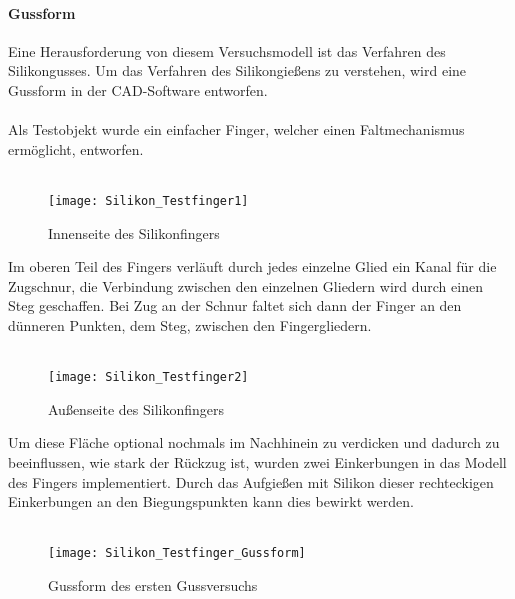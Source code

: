 \documentclass[titlepage,12pt,twoside]{article}
\begin{document}
\paragraph{Gussform}
\label{par:Gussform}
\hfill \break
\hfill \break
Eine Herausforderung von diesem Versuchsmodell ist das Verfahren des Silikongusses.  Um das Verfahren des Silikongießens zu verstehen, wird eine Gussform in der CAD-Software entworfen. \\
\\
Als Testobjekt wurde ein einfacher Finger, welcher einen Faltmechanismus ermöglicht, entworfen. \\
\\
\begin{figure}[H]
	\begin{center}
		\scalebox{0.8}
		{\texttt{[image: Silikon\_Testfinger1]}}
		\caption{Innenseite des Silikonfingers}
		\label{fig:Silikon_Testfinger1}			
	\end{center}
\end{figure}
\hfill \break
Im oberen Teil des Fingers verläuft durch jedes einzelne Glied ein Kanal für die Zugschnur, die Verbindung zwischen den einzelnen Gliedern wird durch einen Steg geschaffen. Bei Zug an der Schnur faltet sich dann der Finger an den dünneren Punkten, dem Steg, zwischen den Fingergliedern. \\
\\
\begin{figure}[H]
	\begin{center}
		\scalebox{0.8}
		{\texttt{[image: Silikon\_Testfinger2]}}
		\caption{Außenseite des Silikonfingers}
		\label{fig:Silikon_Testfinger2}			
	\end{center}
\end{figure}
\hfill \break
Um diese Fläche optional nochmals im Nachhinein zu verdicken und dadurch zu beeinflussen, wie stark der Rückzug ist, wurden zwei Einkerbungen in das Modell des Fingers implementiert. Durch das Aufgießen mit Silikon dieser rechteckigen Einkerbungen 
an den Biegungspunkten kann dies bewirkt werden. \\
\\
\begin{figure}[H]
	\begin{center}
		\scalebox{0.8}
		{\texttt{[image: Silikon\_Testfinger\_Gussform]}}
		\caption{Gussform des ersten Gussversuchs}
		\label{fig:Silikon_Testfinger_Gussform}			
	\end{center}
\end{figure}
\end{document}
